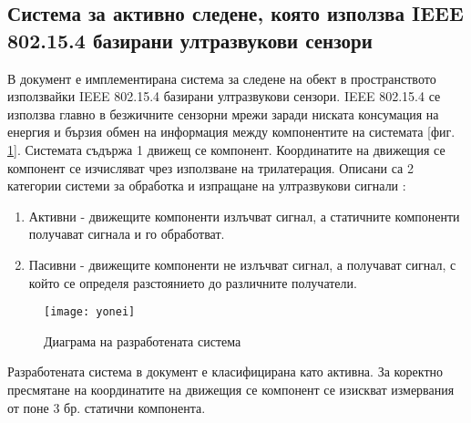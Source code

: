 \subsection{Система за активно следене, която използва IEEE 802.15.4 базирани ултразвукови сензори}

В документ \cite{yonei} е имплементирана система за следене на обект в пространството използвайки IEEE 802.15.4 базирани ултразвукови сензори.
IEEE 802.15.4 се използва главно в безжичните сензорни мрежи заради ниската консумация на енергия и бързия обмен на информация между компонентите на системата [фиг. \ref{fig:yoneiFig}]. Системата съдържа 1 движещ се компонент. Координатите на движещия се компонент се изчисляват чрез използване на трилатерация.  Описани са 2 категории системи за обработка и изпращане на ултразвукови сигнали \cite{sysTypes}:

\begin{enumerate}
    \item Активни - движещите компоненти излъчват сигнал, а статичните компоненти получават сигнала и го обработват.
    \item Пасивни - движещите компоненти не излъчват сигнал, а получават сигнал, с който се определя разстоянието до различните получатели.
\end{enumerate}

\begin{figure}
    \centering
    \texttt{[image: yonei]}
    \caption{Диаграма на разработената система}
    \label{fig:yoneiFig}
\end{figure}

Разработената система в документ \cite{yonei} е класифицирана като активна. За коректно пресмятане на координатите на движещия се компонент се изискват измервания от поне 3 бр. статични компонента. 